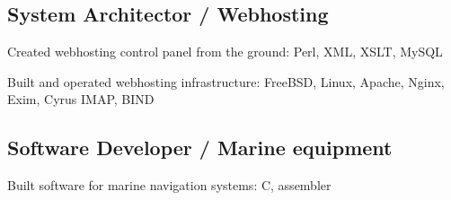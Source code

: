 \documentclass[letter,10pt]{article}
\begin{document}
\subsection{{System Architector / Webhosting}}
\begin{zitemize}
\item Created webhosting control panel from the ground: Perl, XML, XSLT, MySQL
\item Built and operated webhosting infrastructure: FreeBSD, Linux, Apache, Nginx, Exim, Cyrus IMAP, BIND
\end{zitemize}

\subsection{{Software Developer / Marine equipment}}
\begin{zitemize}
\item Built software for marine navigation systems: C, assembler
\end{zitemize}
\end{document}
